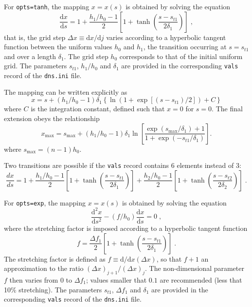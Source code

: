 For {\tt opts=tanh}, the mapping $x=x(s)$ is obtained by solving the equation
\begin{equation}
\frac{\mathrm{d}x}{\mathrm{d}s} = 1 + \frac{h_1/h_0-1}{2}\left[ 1 + \tanh\left(\frac{s-s_{t1}}{2\delta_1}\right)\right] \;,
\end{equation}
that is, the grid step $\Delta x \equiv\mathrm{d}x/\mathrm{d}j$ varies according to a hyperbolic tangent function between the uniform values $h_0$ and $h_1$, the transition occurring at $s=s_{t1}$ and over a length $\delta_1$. The grid step $h_0$ corresponds to that of the initial uniform grid. The parameters $s_{t1}$, $h_1/h_0$ and $\delta_1$ are provided in the corresponding {\tt vals} record of the {\tt dns.ini} file.

The mapping can be written explicitly as
\begin{equation}
  x = s + (h_1/h_0-1)\delta_1\left\{\ln(1+\exp[(s-s_{t1})/2])+C\right\}
\end{equation}
where $C$ is the integration constant, defined such that $x=0$ for $s=0$. The final extension obeys the relationship
\begin{equation}
  x_\mathrm{max}=s_\mathrm{max} + (h_1/h_0-1)\delta_1\ln\left[\frac{\exp(s_\mathrm{max}/\delta_1)+1}{1+\exp(-s_{t1}/\delta_1)}\right].
\end{equation}
where $s_\mathrm{max} =(n-1)h_0$.

Two transitions are possible if the {\tt vals} record contains 6 elements instead of 3:
\begin{equation}
\frac{dx}{ds} = 1
+ \frac{h_1/h_0-1}{2}\left[ 1 + \tanh\left(\frac{s-s_{t1}}{2\delta_1}\right)\right]
+ \frac{h_2/h_0-1}{2}\left[ 1 + \tanh\left(\frac{s-s_{t2}}{2\delta_2}\right)\right]\;.
\end{equation}

For {\tt opts=exp}, the mapping $x=x(s)$ is obtained by solving the equation
\begin{equation}
\frac{\mathrm{d}^2x}{\mathrm{d}s^2} - (f/h_0)\frac{\mathrm{d}x}{\mathrm{d}s} = 0 \;,
\end{equation}
where the stretching factor is imposed according to a hyperbolic tangent function
\begin{equation}
f = \frac{\Delta f_1}{2}\left[ 1 + \tanh\left(\frac{s-s_{t1}}{2\delta_1}\right)\right] \;.
\end{equation}
The stretching factor is defined as $f\equiv\mathrm{d}/\mathrm{d}x (\Delta x)$, so that $f+1$ an approximation to the ratio $(\Delta x)_{j+1}/(\Delta x) _{j}$. The non-dimensional parameter $f$ then varies from $0$ to $\Delta f_1$; values smaller that $0.1$ are recommended (less that 10\% stretching). The parameters $s_{t1}$, $\Delta f_1$ and $\delta_1$ are provided in the corresponding {\tt vals} record of the {\tt dns.ini} file.

